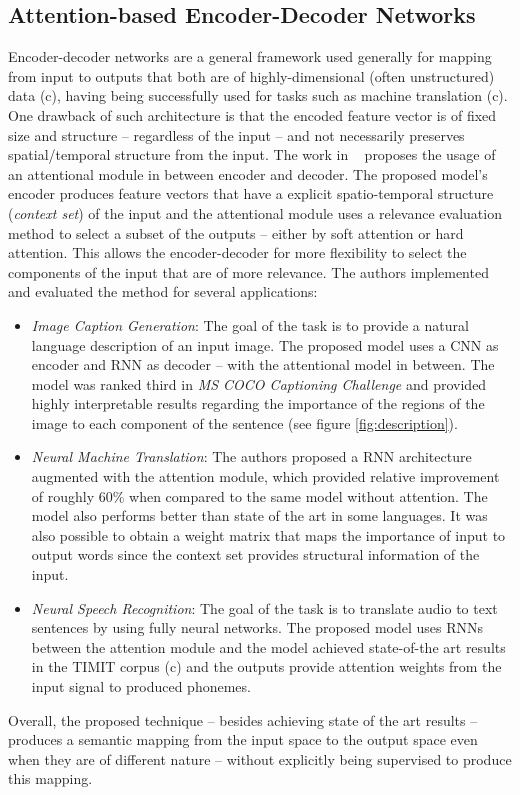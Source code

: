 \documentclass[English]{style/ic-tese-v3}
\begin{document}
\subsection{Attention-based Encoder-Decoder Networks}
Encoder-decoder networks are a general framework used generally for mapping from input to outputs that both
are of highly-dimensional (often unstructured) data (c), having being successfully used for tasks such
as machine translation (c).
One drawback of such architecture is that the encoded feature vector is of fixed size and structure --
regardless of the input -- and not necessarily preserves spatial/temporal structure from the input.
The work in ~\cite{enc-dec} proposes the usage of an attentional module in between encoder and decoder.
The proposed model's encoder produces feature vectors that have a explicit spatio-temporal structure
(\emph{context set}) of the input and the attentional module uses a relevance evaluation
method to select a subset of the outputs -- either by soft attention or hard attention.
This allows the encoder-decoder for more flexibility to select the components of the input that are of
more relevance.
The authors implemented and evaluated the method for several applications:
\begin{itemize}
    \item \emph{Image Caption Generation}: The goal of the task is to provide a natural language description
        of an input image.
        The proposed model uses a CNN as encoder and RNN as decoder -- with the attentional model in between.
        The model was ranked third in \emph{MS COCO Captioning Challenge} and provided highly interpretable
        results regarding the importance of the regions of the image to each component of the sentence
        (see figure \ref{fig:description}).
    \item \emph{Neural Machine Translation}: The authors proposed a RNN architecture
        augmented with the attention module,
        which provided relative improvement of roughly 60\% when compared to the same model without attention.
        The model also performs better than state of the art in some languages.
        It was also possible to obtain a weight matrix that maps the importance of input to output words
        since the context set provides structural information of the input.
    \item \emph{Neural Speech Recognition}: The goal of the task is to translate audio to text sentences by
        using fully neural networks.
        The proposed model uses RNNs between the attention module and the model achieved state-of-the art
        results in the TIMIT corpus (c) and the outputs provide attention weights from the input signal
        to produced phonemes.
\end{itemize}
Overall, the proposed technique -- besides achieving state of the art results --
produces a semantic mapping from the input space to the output space even when they are of different nature
-- without explicitly being supervised to produce this mapping.
\end{document}
